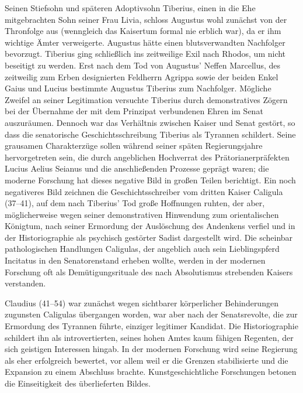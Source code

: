 Seinen Stiefsohn und späteren Adoptivsohn \gls{Tiberius}, einen in die Ehe mitgebrachten Sohn seiner Frau Livia, schloss Augustus wohl zunächst von der Thronfolge aus (wenngleich das Kaisertum formal nie erblich war), da er ihm wichtige Ämter verweigerte. Augustus hätte einen blutsverwandten Nachfolger bevorzugt. \gls{Tiberius} ging schließlich ins zeitweilige Exil nach Rhodos, um nicht beseitigt zu werden. Erst nach dem Tod von Augustus’ Neffen Marcellus, des zeitweilig zum Erben designierten Feldherrn Agrippa sowie der beiden Enkel Gaius und Lucius bestimmte Augustus Tiberius zum Nachfolger. Mögliche Zweifel an seiner Legitimation versuchte \gls{Tiberius} durch demonstratives Zögern bei der Übernahme der mit dem Prinzipat verbundenen Ehren im Senat auszuräumen. Dennoch war das Verhältnis zwischen Kaiser und Senat gestört, so dass die senatorische Geschichtsschreibung Tiberius als Tyrannen schildert. Seine grausamen Charakterzüge sollen während seiner späten Regierungsjahre hervorgetreten sein, die durch angeblichen Hochverrat des Prätorianerpräfekten Lucius Aelius Seianus und die anschließenden Prozesse geprägt waren; die moderne Forschung hat dieses negative Bild in großen Teilen berichtigt.
Ein noch negativeres Bild zeichnen die Geschichtsschreiber vom dritten Kaiser \gls{Caligula} (37–41), auf dem nach Tiberius’ Tod große Hoffnungen ruhten, der aber, möglicherweise wegen seiner demonstrativen Hinwendung zum orientalischen Königtum, nach seiner Ermordung der Auslöschung des Andenkens verfiel und in der Historiographie als psychisch gestörter Sadist dargestellt wird. Die scheinbar pathologischen Handlungen \gls{Caligula}s, der angeblich auch sein Lieblingspferd Incitatus in den Senatorenstand erheben wollte, werden in der modernen Forschung oft als Demütigungsrituale des nach Absolutismus strebenden Kaisers verstanden.

\gls{Claudius} (41–54) war zunächst wegen sichtbarer körperlicher Behinderungen zugunsten Caligulas übergangen worden, war aber nach der Senatsrevolte, die zur Ermordung des Tyrannen führte, einziger legitimer Kandidat. Die Historiographie schildert ihn als introvertierten, seines hohen Amtes kaum fähigen Regenten, der sich geistigen Interessen hingab. In der modernen Forschung wird seine Regierung als eher erfolgreich bewertet, vor allem weil er die Grenzen stabilisierte und die Expansion zu einem Abschluss brachte. Kunstgeschichtliche Forschungen betonen die Einseitigkeit des überlieferten Bildes.

